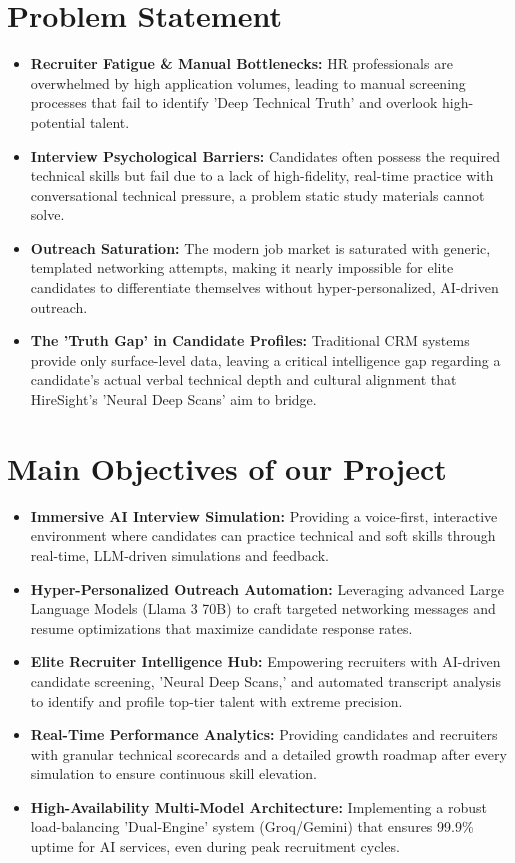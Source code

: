 \documentclass[12pt]{article}
\begin{document}
\section{Problem Statement}
\begin{itemize}
    \item \textbf{Recruiter Fatigue \& Manual Bottlenecks:} HR professionals are overwhelmed by high application volumes, leading to manual screening processes that fail to identify 'Deep Technical Truth' and overlook high-potential talent.
    \item \textbf{Interview Psychological Barriers:} Candidates often possess the required technical skills but fail due to a lack of high-fidelity, real-time practice with conversational technical pressure, a problem static study materials cannot solve.
    \item \textbf{Outreach Saturation:} The modern job market is saturated with generic, templated networking attempts, making it nearly impossible for elite candidates to differentiate themselves without hyper-personalized, AI-driven outreach.
    \item \textbf{The 'Truth Gap' in Candidate Profiles:} Traditional CRM systems provide only surface-level data, leaving a critical intelligence gap regarding a candidate's actual verbal technical depth and cultural alignment that HireSight's 'Neural Deep Scans' aim to bridge.
\end{itemize}

\section{Main Objectives of our Project}
\begin{itemize}
    \item \textbf{Immersive AI Interview Simulation:} Providing a voice-first, interactive environment where candidates can practice technical and soft skills through real-time, LLM-driven simulations and feedback.
    \item \textbf{Hyper-Personalized Outreach Automation:} Leveraging advanced Large Language Models (Llama 3 70B) to craft targeted networking messages and resume optimizations that maximize candidate response rates.
    \item \textbf{Elite Recruiter Intelligence Hub:} Empowering recruiters with AI-driven candidate screening, 'Neural Deep Scans,' and automated transcript analysis to identify and profile top-tier talent with extreme precision.
    \item \textbf{Real-Time Performance Analytics:} Providing candidates and recruiters with granular technical scorecards and a detailed growth roadmap after every simulation to ensure continuous skill elevation.
    \item \textbf{High-Availability Multi-Model Architecture:} Implementing a robust load-balancing 'Dual-Engine' system (Groq/Gemini) that ensures 99.9\% uptime for AI services, even during peak recruitment cycles.
\end{itemize}
\end{document}
